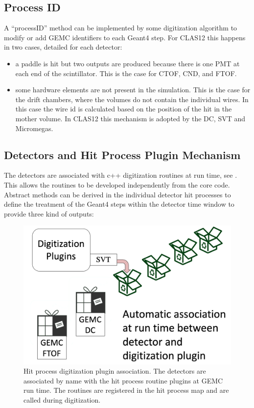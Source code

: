 \subsection{Process ID}

A ``processID'' method can be implemented by some digitization algorithm to modify or add GEMC identifiers to each Geant4 step. For CLAS12 this happens in two
cases, detailed for each detector:

\begin{itemize}
	\item a paddle is hit but two outputs are produced because there is one PMT at each end of the scintillator. This
          is the case for CTOF, CND, and FTOF.
    \item some hardware elements are not present in the simulation. This is the case for the drift chambers, where the volumes do not contain
          the individual wires. In this case the wire id is calculated based on the position of the hit in the mother volume. In CLAS12 this mechanism
          is adopted by the DC, SVT and Micromegas.
\end{itemize}


\subsection{Detectors and Hit Process Plugin Mechanism}

The detectors are associated with c++ digitization routines at run time, see .
This allows the routines to be developed independently from the core code. Abstract methods can be derived in
the individual detector hit processes to define the treatment of the Geant4 steps within the detector
time window to provide three kind of outputs:

\begin{figure}
	\centering
	\includegraphics[width=1.0\columnwidth,keepaspectratio]{img/pluginsAssociation.png}
	\caption{Hit process digitization plugin association. The detectors are associated by name with the hit process routine
             plugins at GEMC run time. The routines are registered in the hit process map and are called during digitization.}
	\label{fig:pluginsAssociation}
\end{figure}



